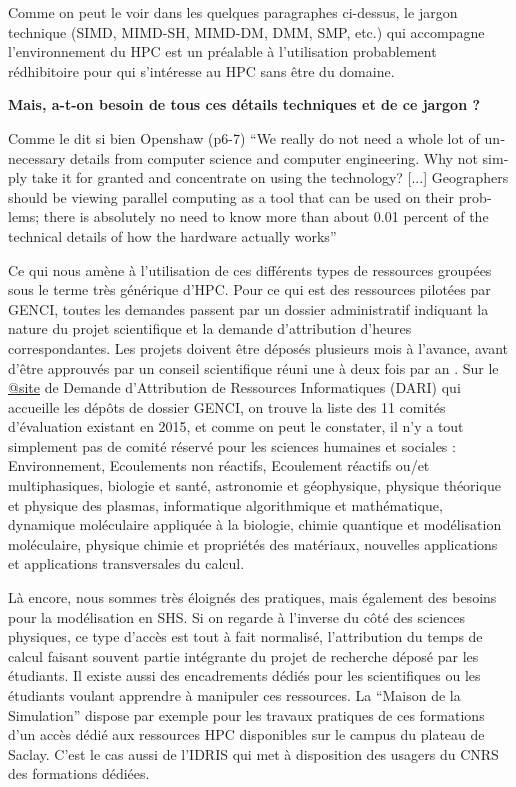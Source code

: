 Comme on peut le voir dans les quelques paragraphes ci-dessus, le jargon technique (SIMD, MIMD-SH, MIMD-DM, DMM, SMP, etc.) qui accompagne l'environnement du HPC est un préalable à l'utilisation probablement rédhibitoire pour qui s'intéresse au HPC sans être du domaine.

\textbf{Mais, a-t-on besoin de tous ces détails techniques et de ce jargon ?}

Comme le dit si bien Openshaw (p6-7) \foreignquote{english}{We really do not need a whole lot of unnecessary details from computer science and computer engineering. Why not simply take it for granted and concentrate on using the technology? [...] Geographers should be viewing parallel computing as a tool that can be used on their problems; there is absolutely no need to know more than about 0.01 percent of the technical details of how the hardware actually works}

Ce qui nous amène à l'utilisation de ces différents types de ressources groupées sous le terme très générique d'HPC. Pour ce qui est des ressources pilotées par GENCI, toutes les demandes passent par un dossier administratif indiquant la nature du projet scientifique et la demande d'attribution d'heures correspondantes. Les projets doivent être déposés plusieurs mois à l'avance, avant d'être approuvés par un conseil scientifique réuni une à deux fois par an \autocite{GENCI2015}. Sur le \href{https://www.edari.fr/}{@site} de Demande d'Attribution de Ressources Informatiques (DARI) qui accueille les dépôts de dossier GENCI, on trouve la liste des 11 comités d'évaluation existant en 2015, et comme on peut le constater, il n'y a tout simplement pas de comité réservé pour les sciences humaines et sociales : Environnement, Ecoulements non réactifs, Ecoulement réactifs ou/et multiphasiques, biologie et santé, astronomie et géophysique, physique théorique et physique des plasmas, informatique algorithmique et mathématique, dynamique moléculaire appliquée à la biologie, chimie quantique et modélisation moléculaire, physique chimie et propriétés des matériaux, nouvelles applications et applications transversales du calcul.

Là encore, nous sommes très éloignés des pratiques, mais également des besoins pour la modélisation en SHS. Si on regarde à l'inverse du côté des sciences physiques, ce type d'accès est tout à fait normalisé, l'attribution du temps de calcul faisant souvent partie intégrante du projet de recherche déposé par les étudiants. Il existe aussi des encadrements dédiés pour les scientifiques ou les étudiants voulant apprendre à manipuler ces ressources. La \enquote{Maison de la Simulation} dispose par exemple pour les travaux pratiques de ces formations d'un accès dédié aux ressources HPC disponibles sur le campus du plateau de Saclay. C'est le cas aussi de l'IDRIS qui met à disposition des usagers du CNRS des formations dédiées. 

